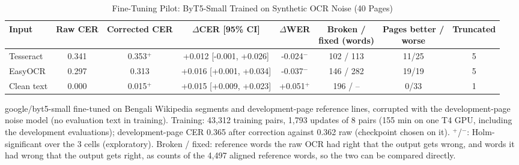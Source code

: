 \begin{table}[t]
\centering
\caption{Fine-Tuning Pilot: ByT5-Small Trained on Synthetic OCR Noise (40 Pages)}
\label{tab:finetune}
\setlength{\tabcolsep}{4pt}
\footnotesize
\begin{tabular}{lccccccc}
\toprule
Input & Raw CER & Corrected CER & $\Delta$CER [95\% CI] & $\Delta$WER & \shortstack{Broken /\\fixed (words)} & \shortstack{Pages better /\\worse} & Truncated \\
\midrule
Tesseract & 0.341 & 0.353$^{+}$ & +0.012 [-0.001, +0.026] & -0.024$^{-}$ & 102 / 113 & 11/25 & 5 \\
EasyOCR & 0.297 & 0.313 & +0.016 [+0.001, +0.034] & -0.037$^{-}$ & 146 / 282 & 19/19 & 5 \\
Clean text & 0.000 & 0.015$^{+}$ & +0.015 [+0.009, +0.023] & +0.051$^{+}$ & 196 / -- & 0/33 & 1 \\
\bottomrule
\end{tabular}
\par\smallskip
\begin{minipage}{\linewidth}\footnotesize google/byt5-small fine-tuned on Bengali Wikipedia segments and development-page reference lines, corrupted with the development-page noise model (no evaluation text in training). Training: 43{,}312 training pairs, 1{,}793 updates of 8 pairs (155 min on one T4 GPU, including the development evaluations); development-page CER 0.365 after correction against 0.362 raw (checkpoint chosen on it). $^{+}$/$^{-}$: Holm-significant over the 3 cells (exploratory). Broken / fixed: reference words the raw OCR had right that the output gets wrong, and words it had wrong that the output gets right, as counts of the 4{,}497 aligned reference words, so the two can be compared directly.\end{minipage}
\end{table}
